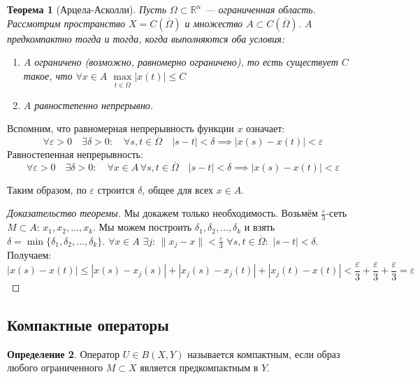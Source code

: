 \documentclass[11pt,openany,a4paper]{scrartcl}
\theoremstyle{plain}
\newtheorem{theorem}{Теорема}[subsection]
\theoremstyle{definition}
\newtheorem{definition}[theorem]{Определение}
\newcommand\mb{\mathbb}
\newcommand\real{\mb R}
\newcommand\ol{\overline}
\begin{document}
\begin{theorem}[Арцела-Асколли]
    Пусть $\Omega \subset \real^n$ — ограниченная область. Рассмотрим пространство
    $X = C(\ol \Omega)$ и множество $A \subset C(\ol \Omega)$.
    $A$ предкомпактно тогда и тогда, когда выполняются оба условия:
    \begin{enumerate}
        \item $A$ ограничено (возможно, равномерно ограничено), то есть существует $C$
        такое, что $\forall x\in A$ $\max\limits_{t \in \ol \Omega}|x(t)| \leqslant C$
        \item $A$ равностепенно непрерывно.
    \end{enumerate}
\end{theorem}

Вспомним, что равномерная непрерывность функции $x$ означает:
$$
\forall \varepsilon > 0\quad \exists\delta > 0:\quad \forall s,t \in \ol \Omega\quad
|s - t| < \delta \implies |x(s) - x(t)| < \varepsilon
$$
Равностепенная непрерывность:
$$
\forall \varepsilon > 0\quad \exists\delta > 0:\quad \forall x\in A\,
\forall s,t \in \ol \Omega\quad |s-t|< \delta \implies |x(s) - x(t)| < \varepsilon
$$

Таким образом, по $\varepsilon$ строится $\delta$, общее для всех $x \in A$.

\begin{proof}[Доказательство теоремы]
    Мы докажем только необходимость. Возьмём $\frac{\varepsilon}{3}$-сеть $M\subset A$:
    $x_1, x_2, \ldots, x_k$. Мы можем построить $\delta_1, \delta_2,\ldots,\delta_k$ и взять
    $\delta = \min\{\delta_1, \delta_2,\ldots,\delta_k\}$.
    $\forall x\in A$ $\exists j$: $\|x_j - x\| < \frac{\varepsilon}{3}$
    $\forall s,t\in\ol \Omega:$ $|s-t|<\delta$. Получаем:
    $$
    |x(s) - x(t)| \leqslant |x(s) - x_j(s)| + |x_j(s) - x_j(t)| + |x_j(t) - x(t)| <
    \frac{\varepsilon}{3} + \frac{\varepsilon}{3} + \frac{\varepsilon}{3} = \varepsilon
    $$
\end{proof}

\subsection{Компактные операторы}

\begin{definition}
    Оператор $U \in B(X, Y)$ называется компактным, если образ любого ограниченного
    $M \subset X$ является предкомпактным в $Y$.
\end{definition}
\end{document}
